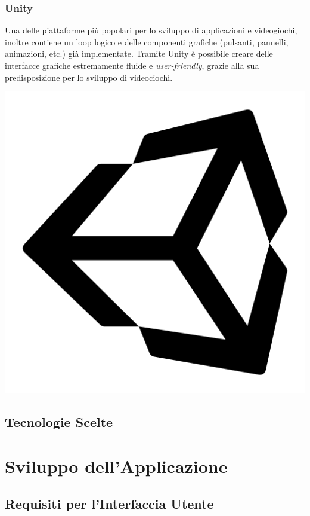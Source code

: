 \documentclass[a4paper,12pt]{report}
\begin{document}
\subsection{Unity}
\begin{minipage}{0.7\textwidth}
    Una delle piattaforme più popolari per lo sviluppo di applicazioni e videogiochi, inoltre contiene un loop logico e delle componenti grafiche (pulsanti, pannelli, animazioni, etc.) già implementate. Tramite Unity è possibile creare delle interfacce grafiche estremamente fluide e \textit{user-friendly}, grazie alla sua predisposizione per lo sviluppo di videociochi.
\end{minipage}
\hfill
\begin{minipage}{0.3\textwidth}
  \includegraphics[width=\textwidth]{img/unity.png}
\end{minipage}
%
\section{Tecnologie Scelte}
%
\chapter{Sviluppo dell'Applicazione}
%
\section{Requisiti per l'Interfaccia Utente}
%
\end{document}
